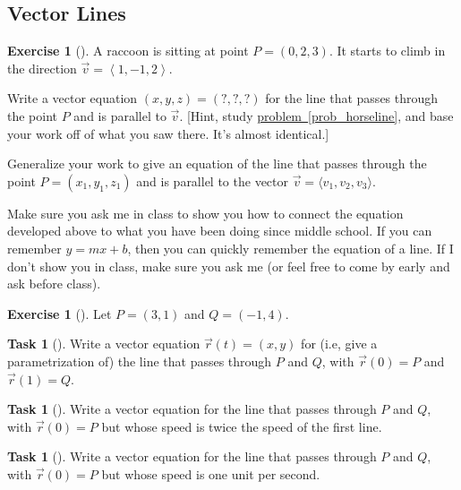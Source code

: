 \documentclass[10pt,]{book}
\theoremstyle{plain}
\theoremstyle{definition}
\theoremstyle{definition}
\theoremstyle{definition}
\theoremstyle{definition}
\newtheorem{exploration}[project]{Exercise}
\newtheorem{task}[project]{Task}
\theoremstyle{definition}
\numberwithin{equation}{section}
\newcommand{\lt}{<}
\begin{document}
\subsection[{Vector Lines}]{Vector Lines}\label{subsection-7}
\begin{exploration}[]\label{exploration-27}
A raccoon is sitting at point \(P=(0,2,3)\). It starts to climb in the direction \(\vec v=\left\lt 1,-1,2\right>\).%
\par
Write a vector equation \((x,y,z)=(?,?,?)\) for the line that passes through the point \(P\) and is parallel to \(\vec v\). [Hint, study \hyperref[prob_horseline]{problem~\ref{prob_horseline}}, and base your work off of what you saw there. It's almost identical.]%
\par
Generalize your work to give an equation of the line that passes through the point \(P=(x_1,y_1,z_1)\) and is parallel to the vector \(\vec v=\langle v_1,v_2,v_3 \rangle\).%
\end{exploration}
Make sure you ask me in class to show you how to connect the equation developed above to what you have been doing since middle school. If you can remember \(y=mx+b\), then you can quickly remember the equation of a line. If I don't show you in class, make sure you ask me (or feel free to come by early and ask before class).%
\begin{exploration}[]\label{first_line_between_two_points}
Let \(P=(3,1)\) and \(Q=(-1,4)\).%
\begin{task}[]\label{task-57}
Write a vector equation \(\vec r(t)=(x,y)\) for (i.e, give a parametrization of) the line that passes through \(P\) and \(Q\), with \(\vec r(0)=P\) and \(\vec r(1)=Q\).%
\end{task}
\begin{task}[]\label{task-58}
Write a vector equation for the line that passes through \(P\) and \(Q\), with \(\vec r(0)=P\) but whose speed is twice the speed of the first line.%
\end{task}
\begin{task}[]\label{task-59}
Write a vector equation for the line that passes through \(P\) and \(Q\), with \(\vec r(0)=P\) but whose speed is one unit per second.%
\end{task}
\end{exploration}
\typeout{************************************************}
\typeout{************************************************}
\end{document}
